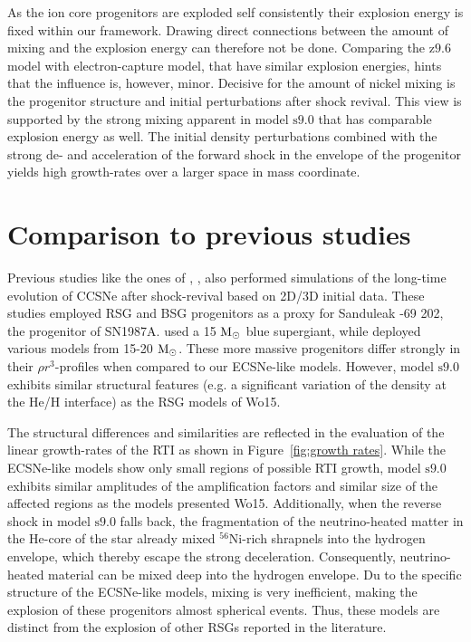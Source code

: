 \documentclass[fleqn,usenatbib]{mnras}
\newcommand{\nickel}{\ensuremath{\mathrm{^{56}Ni}}\xspace}
\newcommand{\solm}{\ensuremath{\rm{M_{\odot}}}\xspace}
\newcommand{\snine}{\ensuremath{\mathrm{s9.0}}\xspace}
\newcommand{\znine}{\ensuremath{\mathrm{z9.6}}\xspace}
\begin{document}
As the ion core progenitors are exploded self consistently their explosion energy is fixed within our framework. Drawing direct connections between the amount of mixing and the explosion energy can therefore not be done. Comparing the \znine model with electron-capture model, that have similar explosion energies, hints that the influence is, however, minor. Decisive for the amount of nickel mixing is the progenitor structure and initial perturbations after shock revival. This view is supported by the strong mixing apparent in model \snine that has comparable explosion energy as well. The initial density perturbations combined with the strong de- and acceleration of the forward shock in the envelope of the progenitor yields high growth-rates over a larger space in mass coordinate. 


\section{Comparison to previous studies}
\label{sec:Comparison to previous studies}

Previous studies like the ones of \cite{Hammer2010}, \citet{Wongwathanarat2015}, \citet{Kifonidis2006} also performed simulations of the long-time evolution of CCSNe after shock-revival based on 2D/3D initial data. These studies employed RSG and BSG progenitors as a proxy for Sanduleak -69 202, the progenitor of SN1987A. \citet{Hammer2010} used a 15 \solm blue supergiant, while \citet{Wongwathanarat2015}  deployed various models from 15-20 \solm. 
These more massive progenitors differ strongly in their $\rho r^3$-profiles when compared to our ECSNe-like models. However, model \snine exhibits similar structural features (e.g. a significant variation of the density at the He/H interface) as the RSG models of Wo15.

The structural differences and similarities are reflected in the evaluation of the linear growth-rates of the RTI as shown in Figure~\ref{fig:growth rates}. While the ECSNe-like models show only small regions of possible RTI growth, model \snine exhibits similar amplitudes of the amplification factors and similar size of the affected regions as the models presented Wo15. Additionally, when the reverse shock in model \snine falls back, the fragmentation of the neutrino-heated matter in the He-core of the star already mixed \nickel-rich shrapnels into the hydrogen envelope, which thereby escape the strong deceleration. 
Consequently, neutrino-heated material can be mixed deep into the hydrogen envelope. 
Du to the specific structure of the ECSNe-like models, mixing is very inefficient, making the explosion of these progenitors almost spherical events. Thus, these models are distinct from the explosion of other RSGs reported in the literature. 
\end{document}
